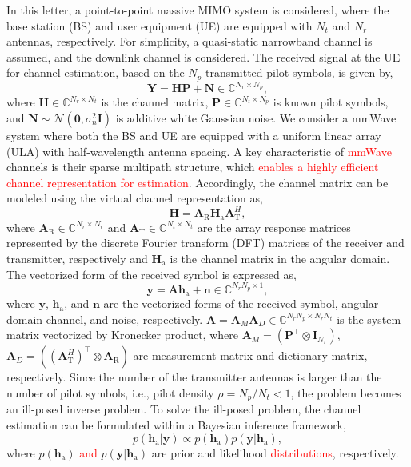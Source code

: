 \documentclass[lettersize,journal]{IEEEtran}
\newcommand{\tred}{\textcolor{red}}
\begin{document}
In this letter, a point-to-point massive MIMO system is considered, where the base station (BS) and user equipment (UE) are equipped with $N_{t}$ and $N_{r}$ antennas, respectively. For simplicity, a quasi-static narrowband channel is assumed, and the downlink channel is considered. The received signal at the UE for channel estimation, based on the $N_{p}$ transmitted pilot symbols, is given by,
\begin{equation}
\mathbf{Y}=\mathbf{H}\mathbf{P}+\mathbf{N}\in \mathbb{C}^{N_{r}\times N_{p}},
\end{equation}
where $\mathbf{H}\in \mathbb{C}^{N_{r}\times N_{t}}$ is the channel matrix, $\mathbf{P}\in \mathbb{C}^{N_{t}\times N_{p}}$ is known pilot symbols, and $\mathbf{N}\sim\mathcal{N}(\mathbf{0},\sigma^{2}_{n}\mathbf{I})$ is additive white Gaussian noise. We consider a mmWave system where both the BS and UE are equipped with a uniform linear array (ULA) with half-wavelength antenna spacing. A key characteristic of \tred{mmWave} channels is their sparse multipath structure, which \tred{enables a highly efficient channel representation for estimation}. Accordingly, the channel matrix can be modeled using the virtual channel representation as,
\begin{equation}
\mathbf{H} = \mathbf{A}_{\text{R}}\mathbf{H}_{\text{a}}\mathbf{A}_{\text{T}}^{H},
\end{equation}
where $\mathbf{A}_{\text{R}}\in \mathbb{C}^{N_{r}\times N_{r}}$ and $\mathbf{A}_{\text{T}}\in \mathbb{C}^{N_{t}\times N_{t}}$ are the array response matrices represented by the discrete Fourier transform (DFT) matrices of the receiver and transmitter, respectively and $\mathbf{H}_{\text{a}}$ is the channel matrix in the angular domain.
The vectorized form of the received symbol is expressed as,
\begin{equation}
\mathbf{y} = \mathbf{A}\mathbf{h}_{\text{a}}+\mathbf{n}\in \mathbb{C}^{N_{r}N_{p}\times 1},
\end{equation}
where $\mathbf{y}$, $\mathbf{h}_{\text{a}}$, and $\mathbf{n}$ are the vectorized forms of the received symbol, angular domain channel, and noise, respectively. $\mathbf{A}=\mathbf{A}_{M}\mathbf{A}_{D}\in \mathbb{C}^{N_{r}N_{p}\times N_{r}N_{t}}$ is the system matrix vectorized by Kronecker product, where $\mathbf{A}_{M} = (\mathbf{P}^{\top}\otimes\mathbf{I}_{N_{r}})$, $\mathbf{A}_{D}=((\mathbf{A}_{\text{T}}^{H})^{\top}\otimes \mathbf{A}_{\text{R}})$ are measurement matrix and dictionary matrix, respectively.
Since the number of the transmitter antennas is larger than the number of pilot symbols, i.e., pilot density $\rho=N_{p}/N_{t}<1$, the problem becomes an ill-posed inverse problem.
To solve the ill-posed problem, the channel estimation can be formulated within a Bayesian inference framework,
\begin{equation}
  p(\mathbf{h}_{\text{a}}|\mathbf{y})\propto p(\mathbf{h}_{\text{a}})p(\mathbf{y}|\mathbf{h}_{\text{a}}),
\end{equation}
where $p(\mathbf{h}_{\text{a}})$ \tred{and} $p(\mathbf{y}|\mathbf{h}_{\text{a}})$ are prior and likelihood \tred{distributions}, respectively.
\end{document}
